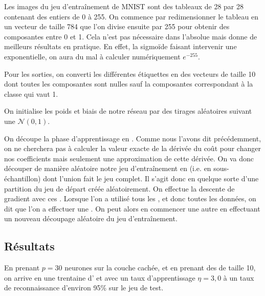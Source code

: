 Les images du jeu d'entraînement de \textsc{MNIST} sont des 
tableaux de 28 par 28 contenant des entiers de 0 à 255.
On commence par redimensionner le tableau en un vecteur 
de taille 784 que l'on divise ensuite par 255 pour obtenir 
des composantes entre 0 et 1. 
Cela n'est pas nécessaire dans l'absolue mais donne de 
meilleurs résultats en pratique.
En effet, la sigmoïde faisant intervenir une exponentielle, 
on aura du mal à calculer numériquement $e^{-255}$.

Pour les sorties, on converti les différentes étiquettes 
en des vecteurs de taille 10 dont toutes les composantes 
sont nulles sauf la composantes correspondant à la classe 
qui vaut 1.

On initialise les poids et biais de notre réseau par des 
tirages aléatoires suivant une $\mathcal{N}(0, 1)$.

On découpe la phase d'apprentissage en . 
Comme nous l'avons dit précédemment, on ne cherchera pas 
à calculer la valeur exacte de la dérivée du coût 
pour changer nos coefficients mais seulement une 
approximation de cette dérivée.
On va donc découper de manière aléatoire notre jeu 
d'entraînement en  (i.e. en sous-échantillon) 
dont l'union fait le jeu complet.
Il s'agit donc en quelque sorte d'une partition du 
jeu de départ créée aléatoirement.
On effectue la descente de gradient avec ces 
. 
Lorsque l'on a utilisé tous les , 
et donc toutes les données, on dit que l'on a 
effectuer une .
On peut alors en commencer une autre en effectuant un 
nouveau découpage aléatoire du jeu d'entraînement.


\subsection{Résultats}


En prenant $p = 30$ neurones sur la couche cachée, et 
en prenant des  de taille 10, 
on arrive en une trentaine d' et avec 
un taux d'apprentissage $\eta = 3,0$ à un taux de 
reconnaissance d'environ 95\% sur le jeu de test.
